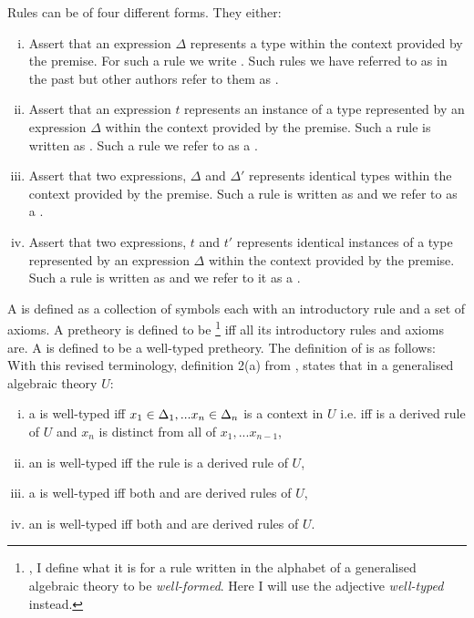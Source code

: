 \note Rules can be of four different forms. They either:

\begin{enumerate}[(i)]
\item Assert that an expression $\Delta$ represents a type within the context provided by the premise. For such a rule we write
. Such rules we have referred to as  \Trules in the past but other authors refer to them as .

\item Assert that an expression $t$ represents an instance of a type represented by an expression $\Delta$ within the context provided by the premise. Such a rule is written as
. Such a rule we refer to as a \trule.

\item Assert that two expressions, $\Delta$ and $\Delta'$ represents identical types within the context provided by the premise. Such a rule is written as 
 and we refer to as a \Teqrule.

\item Assert that two expressions, $t$ and $t'$ represents identical instances of a type represented by an expression $\Delta$  within the context provided by the premise. Such a rule is written as 
 and we  refer to it as a \teqrule.
\end{enumerate}

\note
A  is defined as a collection of symbols each with an introductory rule and a set of axioms. A pretheory is defined to be \footnote{\cite{Cartmell86}, I define what it is for a rule written in the alphabet of a generalised algebraic theory to be \textit{well-formed}. Here I will use the adjective \textit{well-typed} instead.} iff all its introductory rules and axioms are. A  is defined to be a well-typed pretheory. The definition of  is as follows:
With this revised terminology, definition 2(a) from \cite{Cartmell86}, states that in  a generalised algebraic theory $U$:
\begin{enumerate} [(i)]
\item 
a \Trule {} is well-typed  iff 
$x_1 \in \Delta_1,... x_{n} \in \Delta_{n}$ is a context in $U$ i.e. iff 
 is a derived rule of $U$ and $x_n$ is distinct from all of $x_1,...x_{n-1}$, 
\item 
an \trule {} is well-typed iff
the rule  is a derived rule of $U$,
\item 
a \Teqrule {} is well-typed iff
both  and  are derived rules
of $U$,
\item 
an \teqrule {} is well-typed iff
both  and  are derived rules
of $U$.
\end{enumerate}



